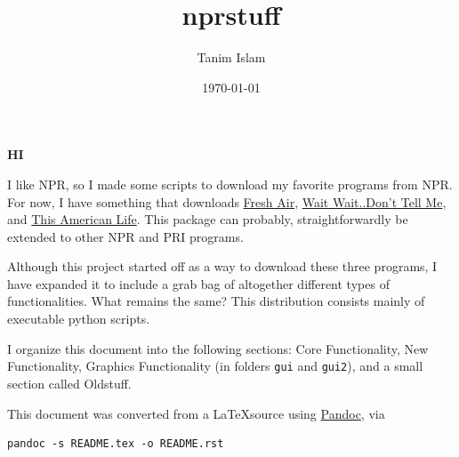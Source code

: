 \documentclass[]{article}
\title{nprstuff}
\date{\today}
\author{Tanim Islam}
\begin{document}
\maketitle

\begin{minipage}[!ht]{0.5\linewidth}
  \textbf{HI}
\end{minipage}

I like NPR, so I made some scripts to download my favorite programs from NPR. For now, I have something that downloads \href{http://www.npr.org/programs/fresh-air/}{Fresh Air}, \href{http://www.npr.org/programs/wait-wait-dont-tell-me/}{Wait Wait..Don't Tell Me}, and \href{http://www.thisamericanlife.org/}{This American Life}. This package can probably, straightforwardly be extended to other NPR and PRI programs.

Although this project started off as a way to download these three programs, I have expanded it to include a grab bag of altogether different types of functionalities. What remains the same? This distribution consists mainly of executable python scripts.

I organize this document into the following sections: Core Functionality, New Functionality, Graphics Functionality (in folders {\verb|gui|} and {\verb|gui2|}), and a small section called Oldstuff.

This document was converted from a \LaTeX source using \href{http://pandoc.org/index.html}{Pandoc}, via
\begin{verbatim}
pandoc -s README.tex -o README.rst
\end{verbatim}
\end{document}
